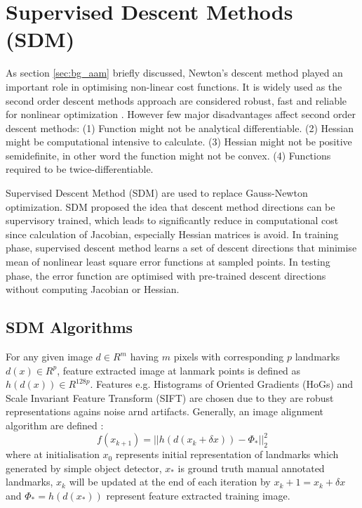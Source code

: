 \section{Supervised Descent Methods (SDM)}
\label{sec:SSD}
As section \ref{sec:bg_aam} briefly discussed, Newton's descent method played an important role in optimising non-linear cost functions. It is widely used as the second order descent methods approach are considered robust, fast and reliable for nonlinear optimization \cite{Xiong2013}. However few major disadvantages affect second order descent methods: (1) Function might not be analytical differentiable. (2) Hessian might be computational intensive to calculate. (3) Hessian might not be positive semidefinite, in other word the function might not be convex. (4) Functions required to be twice-differentiable.

Supervised Descent Method (SDM) are used to replace Gauss-Newton optimization. SDM proposed the idea that descent method directions can be supervisory trained, which leads to significantly reduce in computational cost since calculation of Jacobian, especially Hessian matrices is avoid. In training phase, supervised descent method learns a set of descent directions that minimise mean of nonlinear least square error functions at sampled points. In testing phase, the error function are optimised with pre-trained descent directions without computing Jacobian or Hessian.


\subsection{SDM Algorithms}
For any given image $d \in R^{m}$ having $m$ pixels with corresponding $p$ landmarks $d(x) \in R^{p}$, feature extracted image at lanmark points is defined as $h(d(x)) \in R^{128p}$. Features e.g. Histograms of Oriented Gradients (HoGs) and Scale Invariant Feature Transform (SIFT) \cite{Dalal2005,SIFT} are chosen due to they are robust representations agains noise arnd artifacts. Generally, an image alignment algorithm are defined \cite{Xiong2013}:
\begin{equation}
\label{eq:ssdnd}
f(x_{k+1})=||h(d(x_k+\delta x))-\Phi_*||^2_2
\end{equation}
where at initialisation $x_0$ represents initial representation of landmarks which generated by simple object detector, $x_*$ is ground truth manual annotated landmarks, $x_k$ will be updated at the end of each iteration by $x_k+1=x_k + \delta x$ and $\Phi_* = h(d(x_*))$ represent feature extracted training image. 

